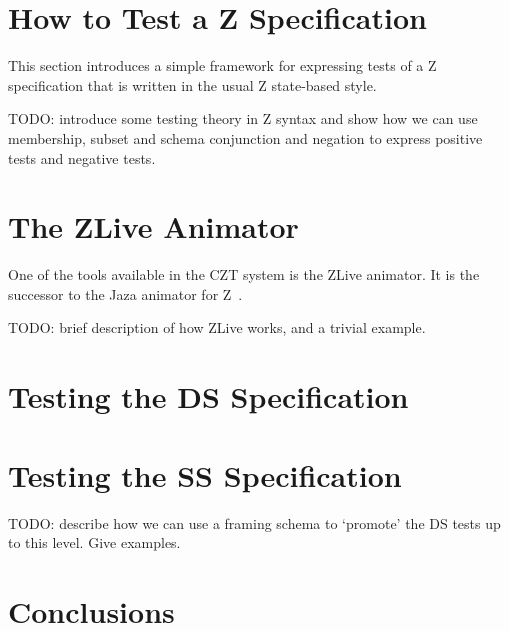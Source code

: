 \documentclass{llncs}
\begin{document}



\section{How to Test a Z Specification}

This section introduces a simple framework for expressing tests
of a Z specification that is written in the usual Z state-based style.

TODO: introduce some testing theory in Z syntax and show how we can
use membership, subset and schema conjunction and negation to 
express positive tests and negative tests.


\section{The ZLive Animator}

One of the tools available in the CZT system is the ZLive animator.
It is the successor to the Jaza animator for Z~\cite{utting:jaza}.

TODO: brief description of how ZLive works, and a trivial example.


\section{Testing the DS Specification}




\section{Testing the SS Specification}

TODO: describe how we can use a framing schema to `promote' the DS tests
up to this level.  Give examples.


\section{Conclusions}
\end{document}
